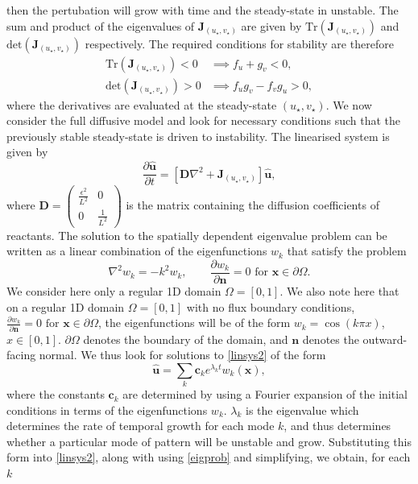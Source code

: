 then the pertubation will grow with time and the steady-state in unstable. The sum and product of the eigenvalues of $\textbf{J}_{(u_\star,v_\star)}$
are given by $\text{Tr}(\textbf{J}_{(u_\star,v_\star)})$ and $\text{det}(\textbf{J}_{(u_\star,v_\star)})$ respectively. The required conditions for stability are therefore
\begin{equation}\label{cond1}
    \begin{split}
\text{Tr}(\textbf{J}_{(u_\star,v_\star)})<0 &\implies f_u+g_v<0, \\
\text{det}(\textbf{J}_{(u_\star,v_\star)})>0 &\implies f_ug_v-f_vg_u>0,
\end{split}
\end{equation}
where the derivatives are evaluated at the steady-state $(u_\star,v_\star)$.
We now consider the full diffusive model and look for necessary conditions such that the previously stable steady-state is driven to instability. The linearised system is given by
\begin{equation}\label{linsys2}
    \frac{\partial \hat{\textbf{u}}}{\partial t}=\left[\textbf{D}\nabla^2+\textbf{J}_{(u_\star,v_\star)} \right]\hat{\textbf{u}},
\end{equation}
where $\textbf{D}=\begin{pmatrix}\frac{\epsilon^2}{L^2}&0\\0&\frac{1}{L^2}\end{pmatrix}$ is the matrix containing the diffusion coefficients of reactants.
The solution to the spatially dependent eigenvalue problem can be written as a linear combination of the eigenfunctions $w_k$ that satisfy the problem
\begin{equation}\label{eigprob}
\nabla^2w_k=-k^2w_k,\quad \quad \frac{\partial w_k}{\partial \textbf{n}}=0\text{ for } \textbf{x}\in\partial\Omega.
\end{equation}
We consider here only a regular 1D domain $\Omega=[0,1]$. We also note here that on a regular 1D domain $\Omega=[0,1]$ with no flux boundary conditions, $\frac{\partial w_k}{\partial \textbf{n}}=0\text{ for } \textbf{x}\in\partial\Omega$, the eigenfunctions will be of the form $w_k=\cos(k\pi x)$, $x\in[0,1]$. $\partial\Omega$ denotes the boundary of the domain, and $\textbf{n}$ denotes the outward-facing normal.
We thus look for solutions to \eqref{linsys2} of the form
\begin{equation}\label{perturbgrow}
    \hat{\textbf{u}}=\sum_k \textbf{c}_ke^{\lambda_k t}w_k(\textbf{x}),
\end{equation}
where the constants $\textbf{c}_k$ are determined by using a Fourier expansion of the initial conditions in terms of the eigenfunctions $w_k$. $\lambda_k$ is the eigenvalue which determines the rate of temporal growth for each mode $k$, and thus determines whether a particular mode of pattern will be unstable and grow. Substituting this form into \eqref{linsys2}, along with using \eqref{eigprob} and simplifying, we obtain, for each $k$
